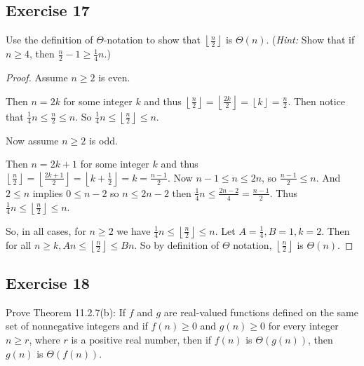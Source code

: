 \documentclass[14pt]{extarticle}
\newcommand{\dps}{\displaystyle}
\newcommand{\floor}[1]{{\left\lfloor#1\right\rfloor}}
\begin{document}
\subsection{Exercise 17}
Use the definition of \(\Theta\)-notation to show that \(\dps \floor{\frac{n}{2}}\) is \(\Theta(n)\). ({\it Hint:} Show 
that if \(n \geq 4\), then \(\dps \frac{n}{2} - 1 \geq \frac{1}{4}n\).)

\begin{proof}
Assume \(n \geq 2\) is even. 

Then \(n = 2k\) for some integer \(k\) and thus \(\dps \floor{\frac{n}{2}} = \floor{\frac{2k}{2}} = \floor{k} = 
\frac{n}{2}\). Then notice that \(\dps \frac{1}{4}n \leq \frac{n}{2} \leq n\). So \(\dps \frac{1}{4}n \leq 
\floor{\frac{n}{2}} \leq n\).

Now assume \(n \geq 2\) is odd. 

Then \(n = 2k+1\) for some integer \(k\) and thus \(\dps \floor{\frac{n}{2}} = \floor{\frac{2k+1}{2}} = \floor{k + 
\frac{1}{2}} = k = \frac{n-1}{2}\). Now \(n-1 \leq n \leq 2n\), so \(\dps \frac{n-1}{2} \leq n\). And \(2 \leq n\) 
implies \(0 \leq n-2\) so \(n \leq 2n - 2\) then \(\dps \frac{1}{4}n \leq \frac{2n-2}{4} = \frac{n-1}{2}\). Thus 
\(\dps \frac{1}{4}n \leq \floor{\frac{n}{2}} \leq n\).

So, in all cases, for \(n \geq 2\) we have \(\dps \frac{1}{4}n \leq \floor{\frac{n}{2}} \leq n\). Let \(A = \frac{1}{4},
B = 1, k = 2\). Then for all \(\dps n \geq k, An \leq \floor{\frac{n}{2}} \leq Bn\). So by definition of \(\Theta\)
notation, \(\dps \floor{\frac{n}{2}}\) is \(\Theta(n)\).
\end{proof}

\subsection{Exercise 18}
Prove Theorem 11.2.7(b): If \(f\) and \(g\) are real-valued functions defined on the same set of nonnegative integers and 
if \(f(n) \geq 0\) and \(g(n) \geq 0\) for every integer \(n \geq r\), where \(r\) is a positive real number, then if 
\(f(n)\) is \(\Theta(g(n))\), then \(g(n)\) is \(\Theta(f(n))\).
\end{document}

